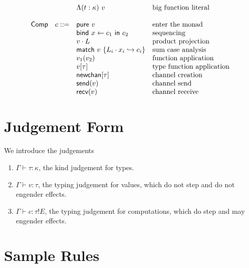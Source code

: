 \documentclass[12pt]{article}
\begin{document}
\[\begin{array}{l r l l}
              &            & \Lambda (t : \kappa) \ v          & \text{big function literal} \\
\\
\textsf{Comp} &      c ::= & \textsf{pure} \ v                 & \text{enter the monad} \\
              &            & \textsf{bind} \ x \leftarrow c_1
                             \ \textsf{in} \ c_2               & \text{sequencing} \\
              &            & v \cdot L                         & \text{product projection} \\
              &            & \textsf{match} \ v \ \{
                             L_i \cdot x_i \hookrightarrow c_i
                             \}                                & \text{sum case analysis} \\
              &            & v_1 (v_2)                         & \text{function application} \\
              &            & v[\tau]                           & \text{type function application} \\
              &            & \textsf{newchan}[\tau]            & \text{channel creation} \\
              &            & \textsf{send}(v)                  & \text{channel send} \\
              &            & \textsf{recv}(v)                  & \text{channel receive} \\
\end{array}
\]

\newpage
\section{Judgement Form}

We introduce the judgements
\begin{enumerate}
\item $\Gamma \vdash \tau : \kappa$, the kind judgement for types.
\item $\Gamma \vdash v : \tau$, the typing judgement for values, which do not
step and do not engender effects.
\item $\Gamma \vdash c : \tau!E$, the typing judgement for computations, which
do step and may engender effects.
\end{enumerate}

\newpage
\section{Sample Rules}
\end{document}
